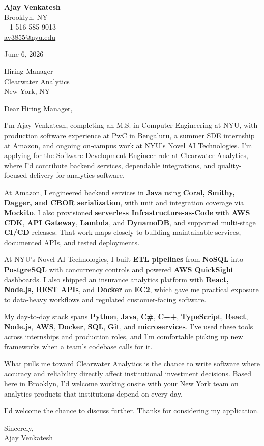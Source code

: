 \documentclass[letterpaper,11pt]{article}
\begin{document}
\begin{flushleft}
\textbf{\large Ajay Venkatesh} \\
Brooklyn, NY \\
+1 516 585 9013 \\
\href{mailto:av3855@nyu.edu}{av3855@nyu.edu}
\end{flushleft}
\vspace{10pt}
June 6, 2026
\vspace{6pt}

Hiring Manager \\
Clearwater Analytics \\
New York, NY

\vspace{10pt}

Dear Hiring Manager,

I'm Ajay Venkatesh, completing an M.S. in Computer Engineering at NYU, with production software experience at PwC in Bengaluru, a summer SDE internship at Amazon, and ongoing on-campus work at NYU's Novel AI Technologies. I'm applying for the Software Development Engineer role at Clearwater Analytics, where I'd contribute backend services, dependable integrations, and quality-focused delivery for analytics software.

At Amazon, I engineered backend services in \textbf{Java} using \textbf{Coral, Smithy, Dagger, and CBOR serialization}, with unit and integration coverage via \textbf{Mockito}. I also provisioned \textbf{serverless Infrastructure-as-Code} with \textbf{AWS CDK}, \textbf{API Gateway}, \textbf{Lambda}, and \textbf{DynamoDB}, and supported multi-stage \textbf{CI/CD} releases. That work maps closely to building maintainable services, documented APIs, and tested deployments.

At NYU's Novel AI Technologies, I built \textbf{ETL pipelines} from \textbf{NoSQL} into \textbf{PostgreSQL} with concurrency controls and powered \textbf{AWS QuickSight} dashboards. I also shipped an insurance analytics platform with \textbf{React, Node.js, REST APIs}, and \textbf{Docker} on \textbf{EC2}, which gave me practical exposure to data-heavy workflows and regulated customer-facing software.

My day-to-day stack spans \textbf{Python}, \textbf{Java}, \textbf{C\#}, \textbf{C++}, \textbf{TypeScript}, \textbf{React}, \textbf{Node.js}, \textbf{AWS}, \textbf{Docker}, \textbf{SQL}, \textbf{Git}, and \textbf{microservices}. I've used these tools across internships and production roles, and I'm comfortable picking up new frameworks when a team's codebase calls for it.

What pulls me toward Clearwater Analytics is the chance to write software where accuracy and reliability directly affect institutional investment decisions. Based here in Brooklyn, I'd welcome working onsite with your New York team on analytics products that institutions depend on every day.

I'd welcome the chance to discuss further. Thanks for considering my application.

\vspace{12pt}
Sincerely, \\
Ajay Venkatesh
\end{document}
